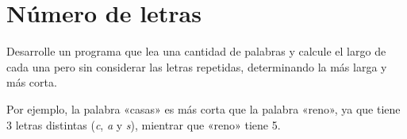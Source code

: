 \section{Número de letras}

Desarrolle un programa que lea una cantidad de palabras y calcule el
largo de cada una pero sin considerar las letras repetidas, determinando
la más larga y más corta.

Por ejemplo, la palabra «casas» es más corta que la palabra «reno», ya
que tiene 3 letras distintas (\emph{c}, \emph{a} y \emph{s}), mientrar
que «reno» tiene 5.
